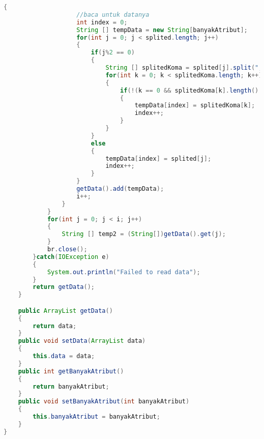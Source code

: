 \begin{lstlisting}[language=Java,basicstyle=\tiny,caption=CSVReader.java]
                {
                    //baca untuk datanya
                    int index = 0;
                    String [] tempData = new String[banyakAtribut];
                    for(int j = 0; j < splited.length; j++)
                    {
                        if(j%2 == 0)
                        {
                            String [] splitedKoma = splited[j].split(",");
                            for(int k = 0; k < splitedKoma.length; k++)
                            {
                                if(!(k == 0 && splitedKoma[k].length() ==0)||(k==splitedKoma.length-1 && splitedKoma[k].length() == 0))
                                {
                                    tempData[index] = splitedKoma[k];
                                    index++;
                                }
                            }
                        }
                        else
                        {
                            tempData[index] = splited[j];
                            index++;
                        }
                    }
                    getData().add(tempData);
                    i++;
                }
            }
            for(int j = 0; j < i; j++)
            {
                String [] temp2 = (String[])getData().get(j);
            }
            br.close();
        }catch(IOException e)
        {
            System.out.println("Failed to read data");
        }
        return getData();
    }

    public ArrayList getData()
    {
        return data;
    }
    public void setData(ArrayList data)
    {
        this.data = data;
    }
    public int getBanyakAtribut()
    {
        return banyakAtribut;
    }
    public void setBanyakAtribut(int banyakAtribut)
    {
        this.banyakAtribut = banyakAtribut;
    }
}
\end{lstlisting}

